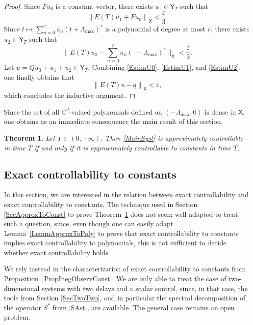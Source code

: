 \documentclass[10pt]{article}
\theoremstyle{plain}
\newtheorem{theo}{Theorem}[section]
\theoremstyle{definition}
\newcommand{\norm}[1]{\left\lVert #1\right\lVert}
\newcommand{\bgnorm}[1]{\biggl\lVert #1\biggr\lVert}
\numberwithin{equation}{section}\numberwithin{figure}{section}\emergencystretch=3em
\begin{document}
\begin{proof}
Since $F u_0$ is a constant vector, there exists $u_1 \in \mathsf Y_T$ such that
\begin{equation}
\label{EstimU1}
\norm{E(T) u_1 + F u_0}_{\mathsf X} < \frac{\varepsilon}{3}.
\end{equation}
Since $t \mapsto \sum_{n=0}^r a_n (t + \Lambda_{\max})^r$ is a polynomial of degree at most $r$, there exists $u_2 \in \mathsf Y_T$ such that
\begin{equation}
\label{EstimU2}
\bgnorm{E(T) u_2 - \sum_{n=0}^r a_n (\cdot + \Lambda_{\max})^r}_{\mathsf X} < \frac{\varepsilon}{3}.
\end{equation}
Let $u = Q u_0 + u_1 + u_2 \in \mathsf Y_T$. Combining \eqref{EstimU0}, \eqref{EstimU1}, and \eqref{EstimU2}, one finally obtains that
\[
\norm{E(T) u - q}_{\mathsf X} < \varepsilon,
\]
which concludes the inductive argument.
\end{proof}

Since the set of all $\mathbb C^d$-valued polynomials defined on $(-\Lambda_{\max}, 0)$ is dense in $\mathsf X$, one obtains as an immediate consequence the main result of this section.

\begin{theo}
\label{TheoApproxConstant}
Let $T \in (0, +\infty)$. Then \eqref{MainSyst} is approximately controllable in time $T$ if and only if it is approximately controllable to constants in time $T$.
\end{theo}

\subsection{Exact controllability to constants}

In this section, we are interested in the relation between exact controllability and exact controllability to constants. The technique used in Section \ref{SecApproxToConst} to prove Theorem~\ref{TheoApproxConstant} does not seem well adapted to treat such a question, since, even though one can easily adapt Lemma~\ref{LemmApproxToPoly} to prove that exact controllability to constants implies exact controllability to polynomials, this is not sufficient to decide whether exact controllability holds.

We rely instead in the characterization of exact controllability to constants from Proposition~\ref{PropInegObservConst}. We are only able to treat the case of two-dimensional systems with two delays and a scalar control, since, in that case, the tools from Section \ref{SecTwoTwo}, and in particular the spectral decomposition of the operator $S^\ast$ from \eqref{SAst}, are available. The general case remains an open problem.
\end{document}
